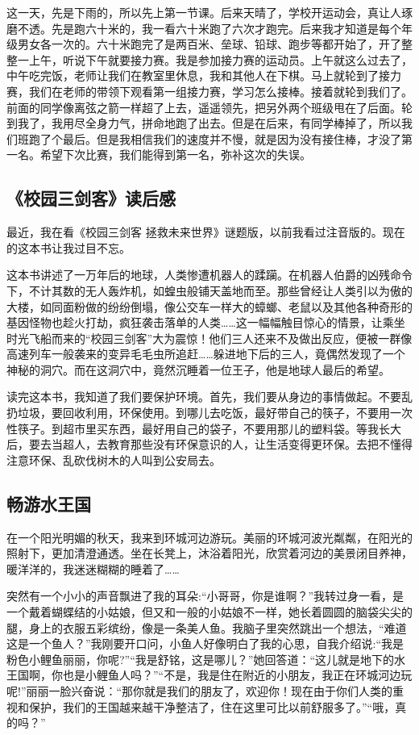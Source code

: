 \documentclass[UTF8,a4paper,titlepage,twoside,10.5pt]{article}
\begin{document}
这一天，先是下雨的，所以先上第一节课。后来天晴了，学校开运动会，真让人琢磨不透。先是跑六十米的，我一看六十米跑了六次才跑完。后来我才知道是每个年级男女各一次的。六十米跑完了是两百米、垒球、铅球、跑步等都开始了，开了整整一上午，听说下午就要接力赛。我是参加接力赛的运动员。上午就这么过去了，中午吃完饭，老师让我们在教室里休息，我和其他人在下棋。马上就轮到了接力赛，我们在老师的带领下观看第一组接力赛，学习怎么接棒。接着就轮到我们了。前面的同学像离弦之箭一样超了上去，遥遥领先，把另外两个班级甩在了后面。轮到我了，我用尽全身力气，拼命地跑了出去。但是在后来，有同学棒掉了，所以我们班跑了个最后。但是我相信我们的速度并不慢，就是因为没有接住棒，才没了第一名。希望下次比赛，我们能得到第一名，弥补这次的失误。

\subsection{《校园三剑客》读后感}
\label{sec:orgcf16d63}

最近，我在看《校园三剑客 拯救未来世界》谜题版，以前我看过注音版的。现在的这本书让我过目不忘。

这本书讲述了一万年后的地球，人类惨遭机器人的蹂躏。在机器人伯爵的凶残命令下，不计其数的无人轰炸机，如蝗虫般铺天盖地而至。那些曾经让人类引以为傲的大楼，如同面粉做的纷纷倒塌，像公交车一样大的蟑螂、老鼠以及其他各种奇形的基因怪物也趁火打劫，疯狂袭击落单的人类……这一幅幅触目惊心的情景，让乘坐时光飞船而来的“校园三剑客”大为震惊！他们三人还来不及做出反应，便被一群像高速列车一般袭来的变异毛毛虫所追赶……躲进地下后的三人，竟偶然发现了一个神秘的洞穴。而在这洞穴中，竟然沉睡着一位王子，他是地球人最后的希望。

读完这本书，我知道了我们要保护环境。首先，我们要从身边的事情做起。不要乱扔垃圾，要回收利用，环保使用。到哪儿去吃饭，最好带自己的筷子，不要用一次性筷子。到超市里买东西，最好用自己的袋子，不要用那儿的塑料袋。等我长大后，要去当超人，去教育那些没有环保意识的人，让生活变得更环保。去把不懂得注意环保、乱砍伐树木的人叫到公安局去。

\subsection{畅游水王国}
\label{sec:org7250c6d}

在一个阳光明媚的秋天，我来到环城河边游玩。美丽的环城河波光粼粼，在阳光的照射下，更加清澄通透。坐在长凳上，沐浴着阳光，欣赏着河边的美景闭目养神，暖洋洋的，我迷迷糊糊的睡着了……

突然有一个小小的声音飘进了我的耳朵:“小哥哥，你是谁啊？”我转过身一看，是一个戴着蝴蝶结的小姑娘，但又和一般的小姑娘不一样，她长着圆圆的脑袋尖尖的腿，身上的衣服五彩缤纷，像是一条美人鱼。我脑子里突然跳出一个想法，“难道这是一个鱼人？”我刚要开口问，小鱼人好像明白了我的心思，自我介绍说:“我是粉色小鲤鱼丽丽，你呢?”“我是舒铭，这是哪儿？”她回答道：“这儿就是地下的水王国啊，你也是小鲤鱼人吗？”“不是，我是住在附近的小朋友，我正在环城河边玩呢!”丽丽一脸兴奋说：“那你就是我们的朋友了，欢迎你！现在由于你们人类的重视和保护，我们的王国越来越干净整洁了，住在这里可比以前舒服多了。”“哦，真的吗？”
\end{document}
